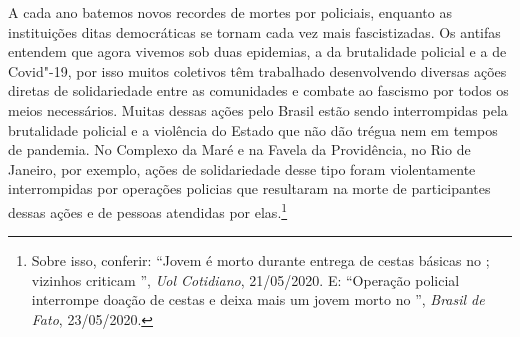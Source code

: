 A cada ano batemos novos recordes de mortes por policiais, enquanto as
instituições ditas democráticas se tornam cada vez mais fascistizadas.
Os antifas entendem que agora vivemos sob duas epidemias, a da
brutalidade policial e a de Covid"-19, por isso muitos coletivos têm
trabalhado desenvolvendo diversas ações diretas de solidariedade entre
as comunidades e combate ao fascismo por todos os meios necessários.
Muitas dessas ações pelo Brasil estão sendo interrompidas pela
brutalidade policial e a violência do Estado que não dão trégua nem em
tempos de pandemia. No Complexo da Maré e na Favela da Providência, no
Rio de Janeiro, por exemplo, ações de solidariedade desse tipo foram
violentamente interrompidas por operações policias que resultaram na
morte de participantes dessas ações e de pessoas atendidas por
elas.\footnote{Sobre isso, conferir:
  ``Jovem é morto durante entrega de cestas básicas no ; vizinhos criticam '', \emph{Uol Cotidiano}, 21/05/2020.
  E: ``Operação policial interrompe doação de cestas e deixa mais um jovem morto no '', \emph{Brasil de Fato}, 23/05/2020.}

